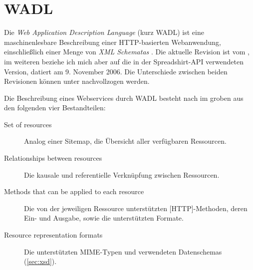 \section{WADL}
\label{sec:wadl}

Die \emph{Web Application Description Language} (kurz \gls{WADL}) ist eine maschinenlesbare Beschreibung einer HTTP-basierten Webanwendung, einschließlich einer Menge von \emph{XML Schematas} \cite{hadleyWADL}.
Die aktuelle Revision ist vom  \cite{WADLcurrent}, im weiteren beziehe ich mich aber auf die in der Spreadshirt-API verwendeten Version, datiert am 9. November 2006. Die Unterschiede zwischen beiden Revisionen können unter \cite{WADLchanges} nachvollzogen werden.

Die Beschreibung eines Webservices durch WADL besteht nach \cite{hadleyWADL} im groben aus den folgenden vier Bestandteilen:
\begin{description}
     \item[Set of resources] Analog einer Sitemap, die Übersicht aller verfügbaren Ressourcen.
     \item[Relationships between resources] Die kausale und referentielle Verknüpfung zwischen Ressourcen.
     \item[Methods that can be applied to each resource] Die von der jeweiligen Ressource unterstützten [HTTP]-Methoden, deren Ein- und Ausgabe, sowie die unterstützten Formate.
     \item[Resource representation formats] Die unterstützten \gls{MIME}-Typen und verwendeten Datenschemas (\cref{sec:xsd}).
 \end{description} 

